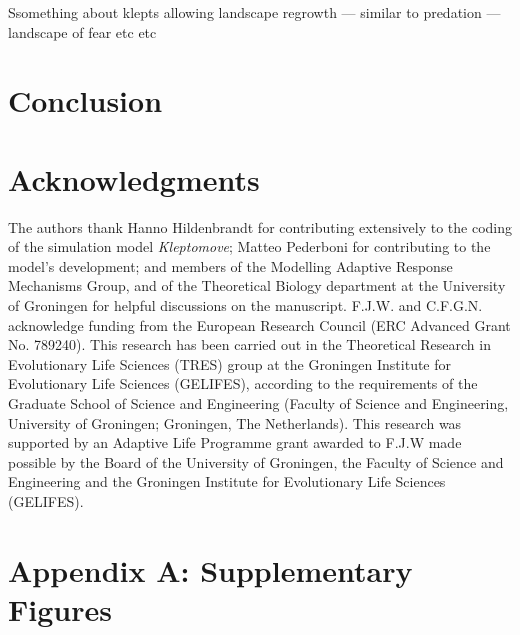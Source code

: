 \documentclass[11pt]{article}
\begin{document}
Ssomething about klepts allowing landscape regrowth --- similar to predation --- landscape of fear etc etc

\section{Conclusion}


\section{Acknowledgments}

The authors thank Hanno Hildenbrandt for contributing extensively to the coding of the simulation model \textit{Kleptomove};
Matteo Pederboni for contributing to the model's development; 
and members of the Modelling Adaptive Response Mechanisms Group, and of the Theoretical Biology department at the University of Groningen for helpful discussions on the manuscript.
F.J.W. and C.F.G.N. acknowledge funding from the European Research Council (ERC Advanced Grant No. 789240).
This research has been carried out in the Theoretical Research in Evolutionary Life Sciences (TRES) group at the Groningen Institute for Evolutionary Life Sciences (GELIFES), according to the requirements of the Graduate School of Science and Engineering (Faculty of Science and Engineering, University of Groningen; Groningen, The  Netherlands).
This research was supported by an Adaptive Life Programme grant awarded to F.J.W made possible by the Board of the University of Groningen, the Faculty of Science and Engineering and the Groningen Institute for Evolutionary Life Sciences (GELIFES).




\newpage{}

\section{Appendix A: Supplementary Figures}
\end{document}
